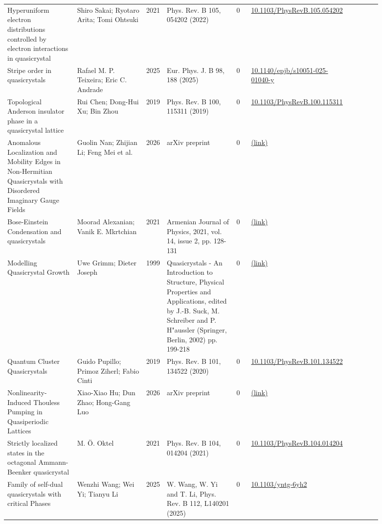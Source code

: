 \documentclass[10pt,a4paper]{article}
\begin{document}
{\begin{longtable}{p{0.192\linewidth}p{0.192\linewidth}p{0.043\linewidth}p{0.192\linewidth}p{0.043\linewidth}p{0.132\linewidth}p{0.096\linewidth}}
Hyperuniform electron distributions controlled by electron interactions in quasicrystal & Shiro Sakai; Ryotaro Arita; Tomi Ohtsuki & 2021 & Phys. Rev. B 105, 054202 (2022) & 0 & \href{https://doi.org/10.1103/PhysRevB.105.054202}{10.1103/PhysRevB.105.054202} &  \\
Stripe order in quasicrystals & Rafael M. P. Teixeira; Eric C. Andrade & 2025 & Eur. Phys. J. B 98, 188 (2025) & 0 & \href{https://doi.org/10.1140/epjb/s10051-025-01040-y}{10.1140/epjb/s10051-025-01040-y} &  \\
Topological Anderson insulator phase in a quasicrystal lattice & Rui Chen; Dong-Hui Xu; Bin Zhou & 2019 & Phys. Rev. B 100, 115311 (2019) & 0 & \href{https://doi.org/10.1103/PhysRevB.100.115311}{10.1103/PhysRevB.100.115311} &  \\
Anomalous Localization and Mobility Edges in Non-Hermitian Quasicrystals with Disordered Imaginary Gauge Fields & Guolin Nan; Zhijian Li; Feng Mei et al. & 2026 & arXiv preprint & 0 & \href{http://arxiv.org/abs/2601.14754v2}{(link)} &  \\
Bose-Einstein Condensation and quasicrystals & Moorad Alexanian; Vanik E. Mkrtchian & 2021 & Armenian Journal of Physics, 2021, vol. 14, issue 2, pp. 128-131 & 0 & \href{http://arxiv.org/abs/2107.02901v1}{(link)} &  \\
Modelling Quasicrystal Growth & Uwe Grimm; Dieter Joseph & 1999 & Quasicrystals - An Introduction to Structure, Physical Properties and Applications, edited by J.-B. Suck, M. Schreiber and P. H"aussler (Springer, Berlin, 2002) pp. 199-218 & 0 & \href{http://arxiv.org/abs/cond-mat/9903074v1}{(link)} &  \\
Quantum Cluster Quasicrystals & Guido Pupillo; Primoz Ziherl; Fabio Cinti & 2019 & Phys. Rev. B 101, 134522 (2020) & 0 & \href{https://doi.org/10.1103/PhysRevB.101.134522}{10.1103/PhysRevB.101.134522} &  \\
Nonlinearity-Induced Thouless Pumping in Quasiperiodic Lattices & Xiao-Xiao Hu; Dun Zhao; Hong-Gang Luo & 2026 & arXiv preprint & 0 & \href{http://arxiv.org/abs/2604.00639v1}{(link)} &  \\
Strictly localized states in the octagonal Ammann-Beenker quasicrystal & M. Ö. Oktel & 2021 & Phys. Rev. B 104, 014204 (2021) & 0 & \href{https://doi.org/10.1103/PhysRevB.104.014204}{10.1103/PhysRevB.104.014204} &  \\
Family of self-dual quasicrystals with critical Phases & Wenzhi Wang; Wei Yi; Tianyu Li & 2025 & W. Wang, W. Yi and T. Li, Phys. Rev. B 112, L140201 (2025) & 0 & \href{https://doi.org/10.1103/yntg-6yh2}{10.1103/yntg-6yh2} &  \\

\end{longtable}}
\end{document}
